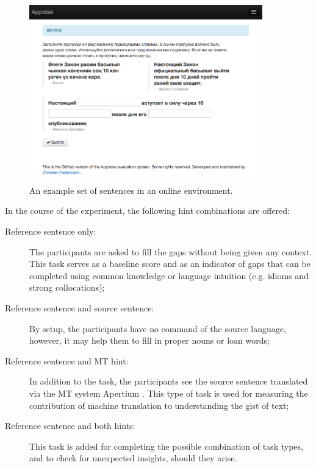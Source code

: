 \documentclass[11pt]{article}
\newcommand{\comment}[1]{\marginpar{\scriptsize\sf \textcolor{blue}{#1}}}
\begin{document}
\begin{figure}
  \centering
\includegraphics[width=0.9\textwidth,resolution=144]{appraise-scr}
 \caption{An example set of sentences in an online environment.}
\label{figure:screenshot}
\end{figure}

\comment{EA: I don't really have a good explanation why we used source+mt tasks, except for being exhaustive. could you suggest anything?}
In the course of the experiment, the following hint combinations are offered:
\begin{description}
\item[Reference sentence only:] The participants are asked to fill the gaps without being given
any context. This task serves as a baseline score and as an indicator of gaps
that can be completed using common knowledge or language intuition (e.g.
idioms and strong collocations);
\item[Reference sentence and source sentence:] By setup, the
participants have no command of the source language, however, it may help them to fill
in proper nouns or loan words;
\item[Reference sentence and MT hint:] In addition to the task, the
participants see the source sentence translated via the MT system Apertium \citep{forcada11}. This type of task is
used for measuring the contribution of machine translation to understanding the
gist of text;
\item[Reference sentence and both hints:] This task is
added for completing the possible combination of task types, and to check
for unexpected insights, should they arise.
\end{description}
\end{document}
